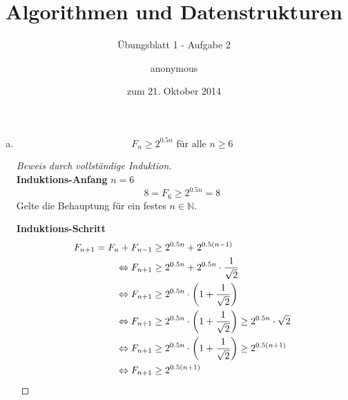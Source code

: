 \documentclass[a4paper]{scrartcl}
\title{Algorithmen und Datenstrukturen}
\subtitle{Übungsblatt 1 - Aufgabe 2}
\author{
    anonymous
}
\date{zum 21. Oktober 2014}
\begin{document}
\maketitle

\begin{enumerate}[(a)]
    \item
        \begin{behaupt}
            \begin{equation}
                F_n \geq 2^{\num{0,5}n} \text{ für alle } n \geq 6
            \end{equation}
        \end{behaupt}
        \begin{proof}[Beweis durch vollständige Induktion] \hfill \\
            \textbf{Induktions-Anfang} $n = 6$ \\
            \begin{equation}
                8 = F_6 \geq 2^{\num{0.5}n} = 8
            \end{equation}
            Gelte die Behauptung für ein festes $n \in \mathbb{N}$.

            \textbf{Induktions-Schritt} \\
            \begin{equation}
                \begin{split}
                    F_{n+1} = F_{n} + F_{n-1} &\geq 2^{\num{0,5}n} + 2^{\num{0,5}(n-1)} \\
                    \Leftrightarrow F_{n+1} &\geq 2^{\num{0,5}n} + 2^{\num{0,5}n} \cdot \frac{1}{\sqrt{2}} \\
                    \Leftrightarrow F_{n+1} &\geq 2^{\num{0,5}n} \cdot \left( 1 + \frac{1}{\sqrt{2}} \right) \\
                    \Leftrightarrow F_{n+1} &\geq 2^{\num{0,5}n} \cdot \left( 1 + \frac{1}{\sqrt{2}} \right)  \geq 2^{\num{0,5}n} \cdot \sqrt{2} \\
                    \Leftrightarrow F_{n+1} &\geq 2^{\num{0,5}n} \cdot \left( 1 + \frac{1}{\sqrt{2}} \right)  \geq 2^{\num{0,5}(n+1)} \\
                    \Leftrightarrow F_{n+1} &\geq  2^{\num{0,5}(n+1)}
                \end{split}
            \end{equation}
        \end{proof}


\end{enumerate}
\end{document}
